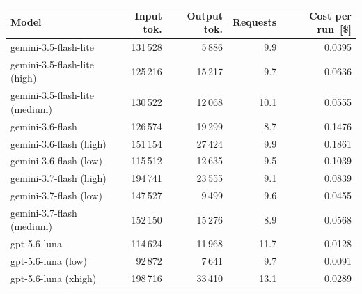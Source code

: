 \begin{tabular}{lrrrr}
\toprule
Model & Input tok. & Output tok. & Requests & Cost per run~[\$] \\
\midrule
gemini-3.5-flash-lite & 131\,528 & 5\,886 & 9.9 & 0.0395 \\
gemini-3.5-flash-lite (high) & 125\,216 & 15\,217 & 9.7 & 0.0636 \\
gemini-3.5-flash-lite (medium) & 130\,522 & 12\,068 & 10.1 & 0.0555 \\
gemini-3.6-flash & 126\,574 & 19\,299 & 8.7 & 0.1476 \\
gemini-3.6-flash (high) & 151\,154 & 27\,424 & 9.9 & 0.1861 \\
gemini-3.6-flash (low) & 115\,512 & 12\,635 & 9.5 & 0.1039 \\
gemini-3.7-flash (high) & 194\,741 & 23\,555 & 9.1 & 0.0839 \\
gemini-3.7-flash (low) & 147\,527 & 9\,499 & 9.6 & 0.0455 \\
gemini-3.7-flash (medium) & 152\,150 & 15\,276 & 8.9 & 0.0568 \\
gpt-5.6-luna & 114\,624 & 11\,968 & 11.7 & 0.0128 \\
gpt-5.6-luna (low) & 92\,872 & 7\,641 & 9.7 & 0.0091 \\
gpt-5.6-luna (xhigh) & 198\,716 & 33\,410 & 13.1 & 0.0289 \\
\bottomrule
\end{tabular}
